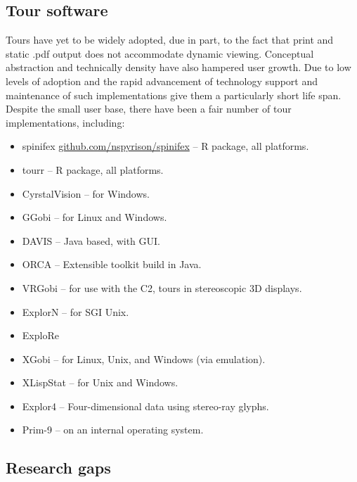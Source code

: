\documentclass{monashthesis}
\begin{document}
\subsection{Tour software}\label{tour-software}

Tours have yet to be widely adopted, due in part, to the fact that print
and static .pdf output does not accommodate dynamic viewing. Conceptual
abstraction and technically density have also hampered user growth. Due
to low levels of adoption and the rapid advancement of technology
support and maintenance of such implementations give them a particularly
short life span. Despite the small user base, there have been a fair
number of tour implementations, including:

\begin{itemize}
\tightlist
\item
  spinifex
  \href{https://github.com/nspyrison/spinifex}{github.com/nspyrison/spinifex}
  -- R package, all platforms.
\item
  tourr \autocite{wickham_tourr_2011} -- R package, all platforms.
\item
  CyrstalVision \autocite{wegman_visual_2003} -- for Windows.
\item
  GGobi \autocite{swayne_ggobi:_2003} -- for Linux and Windows.
\item
  DAVIS \autocite{huh_davis:_2002} -- Java based, with GUI.
\item
  ORCA \autocite{sutherland_orca:_2000} -- Extensible toolkit build in
  Java.
\item
  VRGobi \autocite{nelson_xgobi_1998} -- for use with the C2, tours in
  stereoscopic 3D displays.
\item
  ExplorN \autocite{carr_explorn:_1996} -- for SGI Unix.
\item
  ExploRe \autocite{hardle_xplore:_1995}
\item
  XGobi \autocite{swayne_xgobi:_1991} -- for Linux, Unix, and Windows
  (via emulation).
\item
  XLispStat \autocite{tierney_lisp-stat:_1990} -- for Unix and Windows.
\item
  Explor4 \autocite{carr_explor4:_1988} -- Four-dimensional data using
  stereo-ray glyphs.
\item
  Prim-9 \autocites{asimov_grand_1985}{fisherkeller_prim-9:_1974} -- on
  an internal operating system.
\end{itemize}

\subsection{Research gaps}\label{research-gaps}
\end{document}
